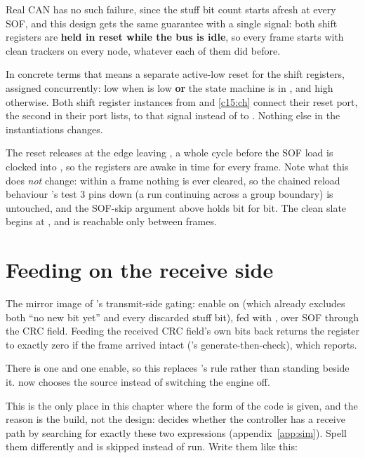 Real CAN has no such failure, since the stuff bit count starts afresh at every SOF, and this design
gets the same guarantee with a single signal: both shift registers are \textbf{held in reset while
the bus is idle}, so every frame starts with clean trackers on every node, whatever each of them did
before.

In concrete terms that means a separate active-low reset for the shift registers, assigned
concurrently: low when  is low \textbf{or} the state machine is in
, and high otherwise. Both shift register instances from  and
\ref{c15:ch} connect their reset port, the second in their port lists, to that signal instead of to
. Nothing else in the instantiations changes.

The reset releases at the edge leaving , a whole cycle before the SOF load is clocked
into , so the registers are awake in time for every frame. Note what this does
\emph{not} change: within a frame nothing is ever cleared, so the chained reload behaviour
's test 3 pins down (a run continuing across a group boundary) is untouched, and the
SOF-skip argument above holds bit for bit. The clean slate begins at , and
 is reachable only between frames.

\section{Feeding  on the receive side}
\label{c17:sec:crc}

The mirror image of 's transmit-side gating: enable  on
 (which already excludes both ``no new bit yet'' and every discarded
stuff bit), fed with , over SOF through the CRC field. Feeding the
received CRC field's own bits back returns the register to exactly zero if the frame arrived intact
('s generate-then-check), which  reports.

There is one  and one enable, so this replaces 's rule rather than
standing beside it.  now chooses the source instead of switching the engine off.

This is the only place in this chapter where the form of the code is given, and the reason is the
build, not the design:  decides whether the controller has a receive path
by searching  for exactly these two expressions (appendix~\ref{app:sim}).
Spell them differently and  is skipped instead of run. Write them like this:

